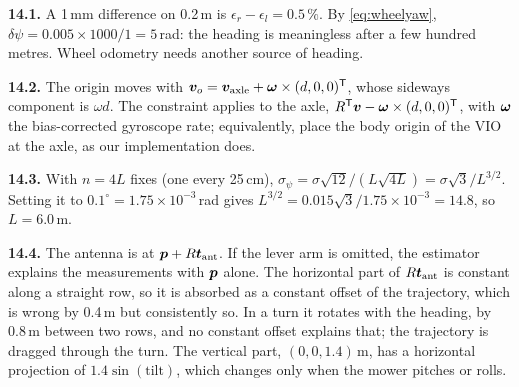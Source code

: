 \textbf{14.1.} A 1\,mm difference on 0.2\,m is $\epsilon_r-\epsilon_l=
0.5\,\%$. By \eqref{eq:wheelyaw}, $\delta\psi=0.005\times1000/1=5$\,rad:
the heading is meaningless after a few hundred metres. Wheel odometry
needs another source of heading.

\textbf{14.2.} The origin moves with $\bm{v}_o=\bm{v}_{\mathrm{axle}}+
\bm{\omega}\times(d,0,0)^{\mathsf{T}}$, whose sideways component is $\omega d$. The
constraint applies to the axle, $R^{\mathsf{T}}\bm{v}-\bm{\omega}\times(d,0,0)^{\mathsf{T}}$, with
$\bm{\omega}$ the bias-corrected gyroscope rate; equivalently, place the body
origin of the VIO at the axle, as our implementation does.

\textbf{14.3.} With $n=4L$ fixes (one every 25\,cm),
$\sigma_\psi=\sigma\sqrt{12}/(L\sqrt{4L})=\sigma\sqrt3/L^{3/2}$. Setting
it to $0.1^\circ=1.75\times10^{-3}$\,rad gives
$L^{3/2}=0.015\sqrt3/1.75\times10^{-3}=14.8$, so $L=6.0$\,m.

\textbf{14.4.} The antenna is at $\bm{p}+R\bm{t}_{\mathrm{ant}}$. If the
lever arm is omitted, the estimator explains the measurements with
$\bm{p}$ alone. The horizontal part of $R\bm{t}_{\mathrm{ant}}$ is constant
along a straight row, so it is absorbed as a constant offset of the
trajectory, which is wrong by 0.4\,m but consistently so. In a turn it
rotates with the heading, by 0.8\,m between two rows, and no constant
offset explains that; the trajectory is dragged through the turn. The
vertical part, $(0,0,1.4)$\,m, has a horizontal projection of
$1.4\sin(\text{tilt})$, which changes only when the mower pitches or
rolls.
